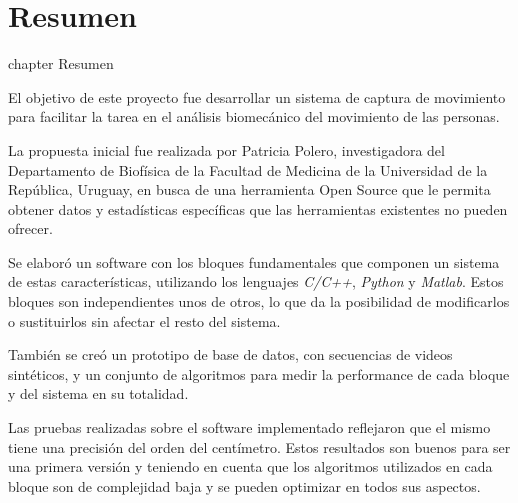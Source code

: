\chapter*{Resumen}
 {chapter} {Resumen}%

El objetivo de este proyecto fue desarrollar un sistema de captura de movimiento para facilitar la tarea en el análisis biomecánico del movimiento de las personas.

\vspace{3 mm}

 La propuesta inicial fue realizada por Patricia Polero, investigadora del Departamento de Biofísica de la Facultad de Medicina de la Universidad de la República, Uruguay, en busca de una herramienta Open Source que le permita obtener datos y estadísticas específicas que las herramientas existentes no pueden ofrecer.

\vspace{3 mm}

Se elaboró un software con los bloques fundamentales que componen un sistema de estas características, utilizando los lenguajes \emph{C/C++}, \emph{Python} y \emph{Matlab}. Estos bloques son independientes unos de otros, lo que da la posibilidad de modificarlos o sustituirlos sin afectar el resto del sistema.

\vspace{3 mm}

También se creó un prototipo de base de datos, con secuencias de videos sintéticos, y un conjunto de algoritmos para medir la performance de cada bloque y del sistema en su totalidad.

\vspace{3 mm}

Las pruebas realizadas sobre el software implementado reflejaron que el mismo tiene una precisión del orden del centímetro. Estos resultados son buenos para ser una primera versión y teniendo en cuenta que los algoritmos utilizados en cada bloque son de complejidad baja y se pueden optimizar en todos sus aspectos.
